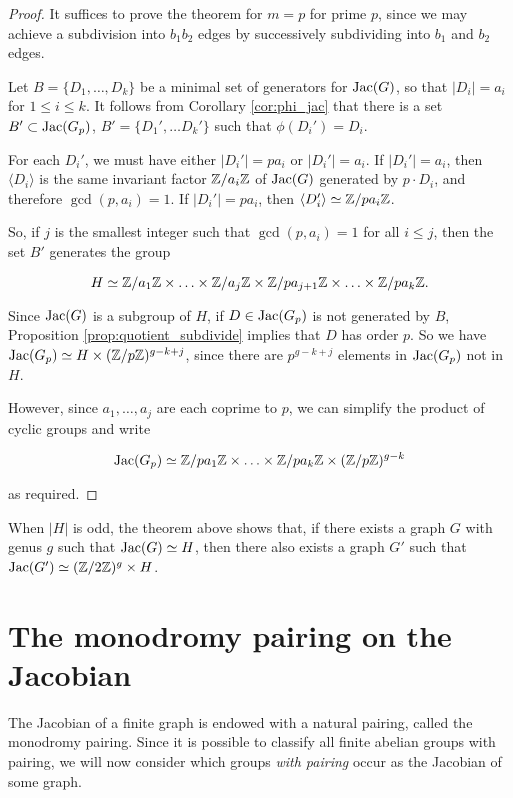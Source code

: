 \documentclass{amsart}
\begin{document}
\begin{proof}
  It suffices to prove the theorem for $m=p$ for prime $p$, since we
  may achieve a subdivision into $b_1b_2$ edges by successively
  subdividing into $b_1$ and $b_2$ edges.
  
  Let $B = \{D_1, \ldots, D_k\}$ be a minimal set of generators for
  $\operatorname{Jac}(G)$, so that $|D_i| = a_i$ for $1 \le i \le k$. It follows
  from Corollary \ref{cor:phi_jac} that there is a set $B' \subset
  \operatorname{Jac}(G_p)$, $B' = \{D_1', \ldots D_k'\}$ such that $\phi(D_i') =
  D_i$.

  For each $D_i'$, we must have either $|D_i'| = pa_i$ or $|D_i'| =
  a_i$. If $|D_i'| = a_i$, then $\langle D_i \rangle$ is the same
  invariant factor $\mathbb{Z}/a_i\mathbb{Z}$ of $\operatorname{Jac}(G)$ generated by $p \cdot D_i$,
  and therefore $\gcd(p, a_i) = 1$. If $|D_i'| = pa_i$, then $\langle
  D_i' \rangle \simeq \mathbb{Z}/pa_i\mathbb{Z}$.

  So, if $j$ is the smallest integer such that $\gcd(p, a_i) = 1$ for
  all $i \le j$, then the set $B'$ generates the group

  $$H \simeq \mathbb{Z}/a_1\mathbb{Z} \times \ldots \times \mathbb{Z}/a_j\mathbb{Z} 
  \times \mathbb{Z}/pa_{j+1}\mathbb{Z} \times \ldots \times \mathbb{Z}/pa_k\mathbb{Z}.$$

  Since $\operatorname{Jac}(G)$ is a subgroup of $H$, if $D \in \operatorname{Jac}(G_p)$ is not
  generated by $B$, Proposition \ref{prop:quotient_subdivide} implies
  that $D$ has order $p$. So we have $\operatorname{Jac}(G_p) \simeq H \times
  (\mathbb{Z}/p\mathbb{Z})^{g-k+j}$, since there are $p^{g-k+j}$ elements in
  $\operatorname{Jac}(G_p)$ not in $H$.

  However, since $a_1, \ldots, a_j$ are each coprime to $p$, we can
  simplify the product of cyclic groups and write

\begin{equation*}
  \operatorname{Jac}(G_p) \simeq \mathbb{Z}/pa_1\mathbb{Z} \times 
  \ldots \times \mathbb{Z}/pa_k\mathbb{Z} \times (\mathbb{Z}/p\mathbb{Z})^{g-k}
\end{equation*}

as required.
\end{proof}

When $|H|$ is odd, the theorem above shows that, if there exists a
graph $G$ with genus $g$ such that $\operatorname{Jac}(G) \simeq H$, then there also
exists a graph $G'$ such that $\operatorname{Jac}(G') \simeq (\mathbb{Z}/2\mathbb{Z})^g \times H$.

\section{The monodromy pairing on the Jacobian}


The Jacobian of a finite graph is endowed with a natural pairing,
called the monodromy pairing. Since it is possible to classify all
finite abelian groups with pairing, we will now consider which groups
\emph{with pairing} occur as the Jacobian of some graph.
\end{document}
